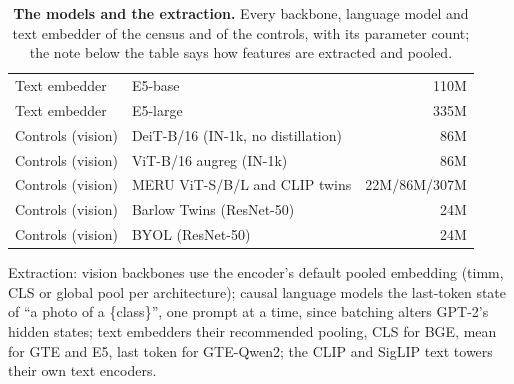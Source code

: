 \begin{table}[H]
\begin{tabular}{llr}
Text embedder & E5-base \citep{e5} & 110M \\
Text embedder & E5-large \citep{e5} & 335M \\
\midrule
Controls (vision) & DeiT-B/16 (IN-1k, no distillation) \citep{deit} & 86M \\
Controls (vision) & ViT-B/16 augreg (IN-1k) \citep{augreg} & 86M \\
Controls (vision) & MERU ViT-S/B/L and CLIP twins \citep{desai2023meru} & 22M/86M/307M \\
Controls (vision) & Barlow Twins (ResNet-50) \citep{zbontar2021barlow} & 24M \\
Controls (vision) & BYOL (ResNet-50) \citep{grill2020bootstrap} & 24M \\
\bottomrule
\end{tabular}\par\vspace{3pt}
{\scriptsize Extraction: vision backbones use the encoder's default pooled embedding (timm, CLS or global pool per architecture); causal language models the last-token state of ``a photo of a \{class\}'', one prompt at a time, since batching alters GPT-2's hidden states; text embedders their recommended pooling, CLS for BGE, mean for GTE and E5, last token for GTE-Qwen2; the CLIP and SigLIP text towers their own text encoders.}

\par\vspace{2pt}
\caption{\textbf{The models and the extraction.} Every backbone, language model and text embedder of the census and of the controls, with its parameter count; the note below the table says how features are extracted and pooled.
}
\label{tab:q14-panel}
\end{table}
